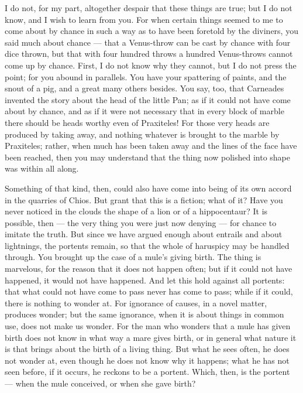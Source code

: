  I do not, for my part, altogether despair that these things are true; but I do not know, and I wish to learn from you. For when certain things seemed to me to come about by chance in such a way as to have been foretold by the diviners, you said much about chance — that a Venus-throw can be cast by chance with four dice thrown, but that with four hundred throws a hundred Venus-throws cannot come up by chance. First, I do not know why they cannot, but I do not press the point; for you abound in parallels. You have your spattering of paints, and the snout of a pig, and a great many others besides. You say, too, that Carneades invented the story about the head of the little Pan; as if it could not have come about by chance, and as if it were not necessary that in every block of marble there should be heads worthy even of Praxiteles! For those very heads are produced by taking away, and nothing whatever is brought to the marble by Praxiteles; rather, when much has been taken away and the lines of the face have been reached, then you may understand that the thing now polished into shape was within all along.

 Something of that kind, then, could also have come into being of its own accord in the quarries of Chios. But grant that this is a fiction; what of it? Have you never noticed in the clouds the shape of a lion or of a hippocentaur? It is possible, then — the very thing you were just now denying — for chance to imitate the truth. But since we have argued enough about entrails and about lightnings, the portents remain, so that the whole of haruspicy may be handled through. You brought up the case of a mule's giving birth. The thing is marvelous, for the reason that it does not happen often; but if it could not have happened, it would not have happened. And let this hold against all portents: that what could not have come to pass never has come to pass; while if it could, there is nothing to wonder at. For ignorance of causes, in a novel matter, produces wonder; but the same ignorance, when it is about things in common use, does not make us wonder. For the man who wonders that a mule has given birth does not know in what way a mare gives birth, or in general what nature it is that brings about the birth of a living thing. But what he sees often, he does not wonder at, even though he does not know why it happens; what he has not seen before, if it occurs, he reckons to be a portent. Which, then, is the portent — when the mule conceived, or when she gave birth?

